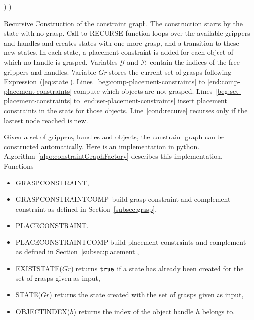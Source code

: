 \begin{algorithm}
\begin{algorithmic}[1]
    \EndFor
    \label{beg:set-placement-constraints}
    )
    )
    \EndIf
    \EndFor\label{end:set-placement-constraints}
    \EndFunction
  \end{algorithmic}
  \caption{Recursive Construction of the constraint graph. The
    construction starts by the state with no grasp. Call to
    {\scriptsize RECURSE} function loops over the available grippers
    and handles and creates states with one more grasp, and a
    transition to these new states. In each state, a placement
    constraint is added for each object of which no handle is
    grasped. Variables $\mathcal{G}$ and $\mathcal{H}$ contain the
    indices of the free grippers and handles. Variable $Gr$ stores the
    current set of grasps following Expression~(\ref{eq:state}).
    Lines~\ref{beg:comp-placement-constraints} to
    \ref{end:comp-placement-constraints}
    compute which objects are not grasped.
    Lines~\ref{beg:set-placement-constraints} to
    \ref{end:set-placement-constraints} insert placement constraints in the
    state for those objects. Line~\ref{cond:recurse} recurses only if the
    lastest node reached is new.}
  \label{algo:constraintGraphFactory}
\end{algorithm}

Given a set of grippers, handles and objects, the constraint graph can be constructed automatically. \href{https://github.com/humanoid-path-planner/hpp-manipulation-corba/blob/5af1b3bad68e8c339d5f42eb72173d7356504532/src/hpp/corbaserver/manipulation/constraint_graph_factory.py#L187}{Here} is an implementation in python. Algorithm~\ref{algo:constraintGraphFactory} describes this implementation.
Functions
\begin{itemize}
\item {\scriptsize GRASP}{\small C}{\scriptsize ONSTRAINT},
\item {\scriptsize GRASP}{\small C}{\scriptsize ONSTRAINT}{\small C}{\scriptsize OMP}, build grasp constraint and complement constraint as defined in Section~\ref{subsec:grasp},
\item {\scriptsize PLACE}{\small C}{\scriptsize ONSTRAINT},
\item {\scriptsize PLACE}{\small C}{\scriptsize ONSTRAINT}{\small C}{\scriptsize OMP} build placement constraints and complement as defined in Section~\ref{subsec:placement},
\item {\scriptsize EXIST}{\small S}{\scriptsize TATE}($Gr$) returns $\texttt{true}$ if a state has already been created for the set of grasps given as input,
\item{\scriptsize STATE}($Gr$) returns the state created with the set of grasps given as input,
\item {\scriptsize OBJECT}{\small I}{\scriptsize NDEX}($h$) returns the index of the object handle $h$ belongs to.
\end{itemize}

